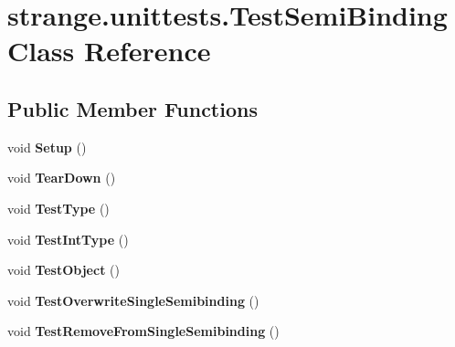 \hypertarget{classstrange_1_1unittests_1_1_test_semi_binding}{\section{strange.\-unittests.\-Test\-Semi\-Binding Class Reference}
\label{classstrange_1_1unittests_1_1_test_semi_binding}
}
\subsection*{Public Member Functions}
\begin{DoxyCompactItemize}
\item 
\hypertarget{classstrange_1_1unittests_1_1_test_semi_binding_abfe4a4d0746b92c533306ac80f6f73ef}{void {\bfseries Setup} ()}\label{classstrange_1_1unittests_1_1_test_semi_binding_abfe4a4d0746b92c533306ac80f6f73ef}

\item 
\hypertarget{classstrange_1_1unittests_1_1_test_semi_binding_a72a53640f777645e1f786a9c7e627252}{void {\bfseries Tear\-Down} ()}\label{classstrange_1_1unittests_1_1_test_semi_binding_a72a53640f777645e1f786a9c7e627252}

\item 
\hypertarget{classstrange_1_1unittests_1_1_test_semi_binding_ab41c9859776967a6702a0588609aefa8}{void {\bfseries Test\-Type} ()}\label{classstrange_1_1unittests_1_1_test_semi_binding_ab41c9859776967a6702a0588609aefa8}

\item 
\hypertarget{classstrange_1_1unittests_1_1_test_semi_binding_a5cccbbd99067e312038de5a859ccd1ba}{void {\bfseries Test\-Int\-Type} ()}\label{classstrange_1_1unittests_1_1_test_semi_binding_a5cccbbd99067e312038de5a859ccd1ba}

\item 
\hypertarget{classstrange_1_1unittests_1_1_test_semi_binding_a8a222fc2fdb82000995c83531f863aec}{void {\bfseries Test\-Object} ()}\label{classstrange_1_1unittests_1_1_test_semi_binding_a8a222fc2fdb82000995c83531f863aec}

\item 
\hypertarget{classstrange_1_1unittests_1_1_test_semi_binding_a74663905e7e0d9efd2399f56d6914a06}{void {\bfseries Test\-Overwrite\-Single\-Semibinding} ()}\label{classstrange_1_1unittests_1_1_test_semi_binding_a74663905e7e0d9efd2399f56d6914a06}

\item 
\hypertarget{classstrange_1_1unittests_1_1_test_semi_binding_a53f5d9dbc684fd1210a89ff198163714}{void {\bfseries Test\-Remove\-From\-Single\-Semibinding} ()}\label{classstrange_1_1unittests_1_1_test_semi_binding_a53f5d9dbc684fd1210a89ff198163714}


\end{DoxyCompactItemize}
